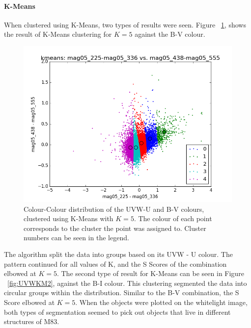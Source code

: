\paragraph{K-Means}

When clustered using K-Means, two types of results were seen.
Figure ~\ref{fig:UVWKM1}, shows the result of K-Means clustering for $K=5$ against the B-V colour. 
\begin{figure}
\centering
\includegraphics[width=\linewidth]{figs/kmeans_xy_5cl_mag05_225-mag05_336vsmag05_438-mag05_555}
\caption{Colour-Colour distribution of the UVW-U and B-V colours, clustered using K-Means with $K=5$. The colour of each point corresponds to the cluster the point was assigned to. Cluster numbers can be seen in the legend.}
\label{fig:UVWKM1}
\end{figure}
The algorithm split the data into groups based on its UVW - U colour. The pattern continued for all values of K, and the S Scores of the combination elbowed at $K=5$.
The second type of result for K-Means can be seen in Figure ~\ref{fig:UVWKM2}, against the B-I colour. 
This clustering segmented the data into circular groups within the distribution. 
Similar to the B-V combination, the S Score elbowed at $K=5$. 
When the objects were plotted on the whitelight image, both types of segmentation seemed to pick out objects that live in different structures of M83. %
